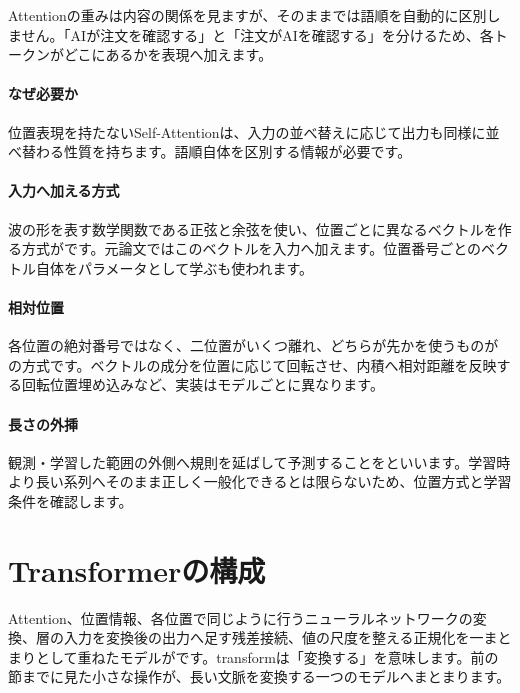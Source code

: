 Attentionの重みは内容の関係を見ますが、そのままでは語順を自動的に区別しません。「AIが注文を確認する」と「注文がAIを確認する」を分けるため、各トークンがどこにあるかを表現へ加えます。

\begingroup
\begingroup
\paragraph{なぜ必要か}
        位置表現を持たないSelf-Attentionは、入力の並べ替えに応じて出力も同様に並べ替わる性質を持ちます。語順自体を区別する情報が必要です。

\paragraph{入力へ加える方式}
        波の形を表す数学関数である正弦と余弦を使い、位置ごとに異なるベクトルを作る方式がです。元論文ではこのベクトルを入力へ加えます。位置番号ごとのベクトル自体をパラメータとして学ぶも使われます。

\par
\endgroup
\medskip
\begingroup
\paragraph{相対位置}
        各位置の絶対番号ではなく、二位置がいくつ離れ、どちらが先かを使うものがの方式です。ベクトルの成分を位置に応じて回転させ、内積へ相対距離を反映する回転位置埋め込みなど、実装はモデルごとに異なります。

\paragraph{長さの外挿}
        観測・学習した範囲の外側へ規則を延ばして予測することをといいます。学習時より長い系列へそのまま正しく一般化できるとは限らないため、位置方式と学習条件を確認します。

\par
\endgroup
\par
\endgroup


\section{Transformerの構成}
\label{sec:06-machine-learning-26}

Attention、位置情報、各位置で同じように行うニューラルネットワークの変換、層の入力を変換後の出力へ足す残差接続、値の尺度を整える正規化を一まとまりとして重ねたモデルがです。transformは「変換する」を意味します。前の節までに見た小さな操作が、長い文脈を変換する一つのモデルへまとまります。

